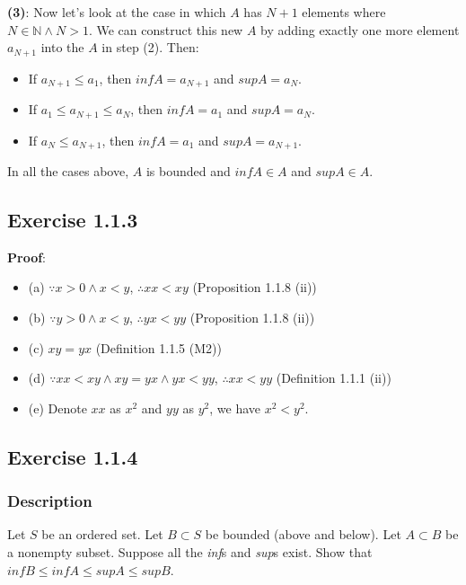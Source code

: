 \documentclass[12pt, letterpaper, oneside]{book}
\begin{document}
\textbf{(3)}: Now let's look at the case in which $A$ has $N+1$ elements where $N \in \mathbb{N} \land N > 1$. We can
construct this new $A$ by adding exactly one more element $a_{N+1}$ into the $A$ in step (2). Then:
\begin{itemize}
  \item If $a_{N+1} \le a_1$, then $inf A = a_{N+1}$ and $sup A = a_N$.
  \item If $a_1 \le a_{N+1} \le a_N$, then $inf A = a_1$ and $sup A = a_N$.
  \item If $a_N \le a_{N+1}$, then $inf A = a_1$ and $sup A = a_{N+1}$.
\end{itemize}

In all the cases above, $A$ is bounded and $inf A \in A$ and $sup A \in A$.

\subsection{Exercise 1.1.3}

\textbf{Proof}:
\begin{itemize}
  \item (a) $\because x > 0 \land x < y$, $\therefore xx < xy$ (Proposition 1.1.8 (ii))
  \item (b) $\because y > 0 \land x < y$, $\therefore yx < yy$ (Proposition 1.1.8 (ii))
  \item (c) $xy = yx$ (Definition 1.1.5 (M2))
  \item (d) $\because xx < xy \land xy = yx \land yx < yy$, $\therefore xx < yy$ (Definition 1.1.1 (ii))
  \item (e) Denote $xx$ as $x^2$ and $yy$ as $y^2$, we have $x^2 < y^2$.
\end{itemize}

\subsection{Exercise 1.1.4}

\subsubsection{Description}

Let $S$ be an ordered set. Let $B \subset S$ be bounded (above and below). Let $A \subset B$ be a nonempty subset.
Suppose all the \textit{inf}s and \textit{sup}s exist. Show that $inf B \le inf A \le sup A \le sup B$.
\end{document}
